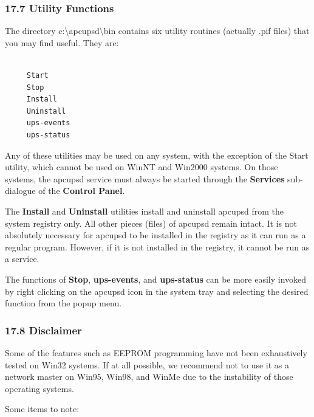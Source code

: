 {{{{{{{{{{\label{Utility-Functions}

\subsubsection*{17.7 Utility Functions}

The directory c:\textbackslash{}apcupsd\textbackslash{}bin contains six
utility routines (actually .pif files) that you may find useful. They are: 

\footnotesize
\begin{verbatim}
     
     Start
     Stop
     Install
     Uninstall
     ups-events
     ups-status
\end{verbatim}
\normalsize

Any of these utilities may be used on any system, with the exception of the
Start utility, which cannot be used on WinNT and Win2000 systems. On those
systems, the apcupsd service must always be started through the {\bf Services}
sub-dialogue of the {\bf Control Panel}.  

The {\bf Install} and {\bf Uninstall} utilities install and uninstall apcupsd
from the system registry only. All other pieces (files) of apcupsd remain
intact. It is not absolutely necessary for apcupsd to be installed in the
registry as it can run as a regular program. However, if it is not installed
in the registry, it cannot be run as a service.  

The functions of {\bf Stop}, {\bf ups-events}, and {\bf ups-status} can be
more easily invoked by right clicking on the apcupsd icon in the system tray
and selecting the desired function from the popup menu. 

\label{Disclaimer}

\subsubsection*{17.8 Disclaimer}

\label{index-Disclaimer-180}
Some of the features such as EEPROM programming have not been exhaustively
tested on Win32 systems. If at all possible, we recommend not to use it as a
network master on Win95, Win98, and WinMe due to the instability of those
operating systems.  

Some items to note:  

}}}}}}}}}}
